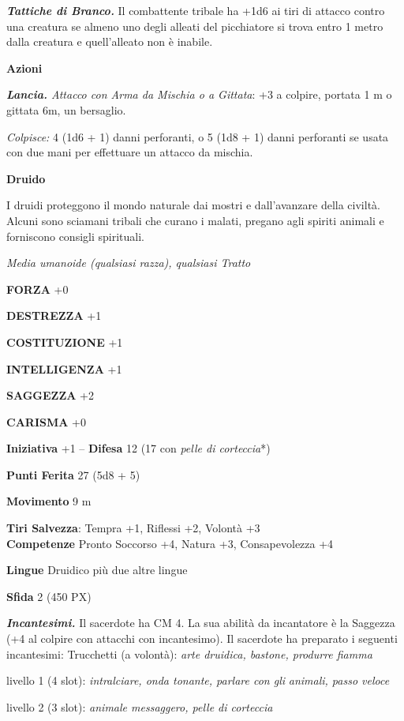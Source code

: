 \begin{multicols}{2}
	\textit{\textbf{Tattiche di Branco.}} Il combattente tribale ha +1d6 ai tiri di attacco contro una creatura se almeno uno degli alleati del picchiatore si trova entro 1 metro dalla creatura e quell'alleato non è inabile.

	\textbf{Azioni}

	\textit{\textbf{Lancia.} Attacco con Arma da Mischia o a Gittata}: +3 a colpire, portata 1 m o gittata 6m, un bersaglio.

	\textit{Colpisce:} 4 (1d6 + 1) danni perforanti, o 5 (1d8 + 1) danni perforanti se usata con due mani per effettuare un attacco da mischia.

	\medskip\textbf{Druido}

	I druidi proteggono il mondo naturale dai mostri e dall'avanzare della civiltà. Alcuni sono sciamani tribali che curano i malati, pregano agli spiriti animali e forniscono consigli spirituali.

	\textit{Media umanoide (qualsiasi razza), qualsiasi Tratto}

	\textbf{FORZA} +0

	\textbf{DESTREZZA} +1

	\textbf{COSTITUZIONE} +1

	\textbf{INTELLIGENZA} +1

	\textbf{SAGGEZZA} +2

	\textbf{CARISMA} +0

	\textbf{Iniziativa} +1 -- \textbf{Difesa} 12 (17 con \textit{pelle di corteccia}*)

	\textbf{Punti Ferita} 27 (5d8 + 5)

	\textbf{Movimento} 9 m

	\textbf{Tiri Salvezza}: Tempra +1, Riflessi +2, Volontà +3 \\

	\textbf{Competenze} Pronto Soccorso +4, Natura +3, Consapevolezza +4

	\textbf{Lingue} Druidico più due altre lingue

	\textbf{Sfida} 2 (450 PX)

	\textit{\textbf{Incantesimi.}} Il sacerdote ha CM 4. La sua abilità da incantatore è la Saggezza (+4 al colpire con attacchi con incantesimo). Il sacerdote ha preparato i seguenti incantesimi: Trucchetti (a volontà): \textit{arte druidica, bastone, produrre fiamma}

	livello 1 (4 slot): \textit{intralciare, onda tonante, parlare con gli}
	\textit{animali, passo veloce}

	livello 2 (3 slot): \textit{animale messaggero, pelle di corteccia}


\end{multicols}
